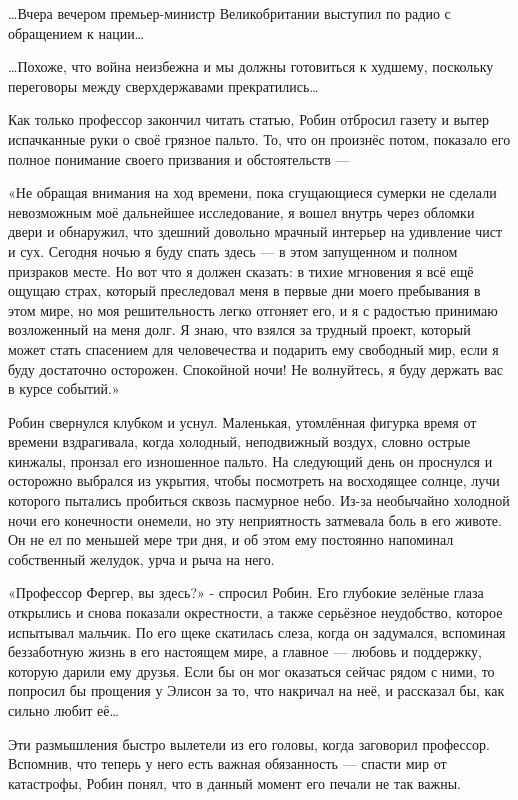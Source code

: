 \documentclass[a5paper, 9pt,
final, openany, twoside=true]{memoir}
\begin{document}
…Вчера вечером премьер-министр Великобритании выступил по радио с обращением к нации…\bigskip

…Похоже, что война неизбежна и мы должны готовиться к худшему, поскольку переговоры между сверхдержавами прекратились…\bigskip

Как только профессор закончил читать статью, Робин отбросил газету и вытер испачканные руки о своё грязное пальто. То, что он произнёс потом, показало его полное понимание своего призвания и обстоятельств —

«Не обращая внимания на ход времени, пока сгущающиеся сумерки не сделали невозможным моё дальнейшее исследование, я вошел внутрь через обломки двери и обнаружил, что здешний довольно мрачный интерьер на удивление чист и сух. Сегодня ночью я буду спать здесь — в этом запущенном и полном призраков месте. Но вот что я должен сказать: в тихие мгновения я всё ещё ощущаю страх, который преследовал меня в первые дни моего пребывания в этом мире, но моя решительность легко отгоняет его, и я с радостью принимаю возложенный на меня долг. Я знаю, что взялся за трудный проект, который может стать спасением для человечества и подарить ему свободный мир, если я буду достаточно осторожен. Спокойной ночи! Не волнуйтесь, я буду держать вас в курсе событий.»\bigskip

Робин свернулся клубком и уснул. Маленькая, утомлённая фигурка время от времени вздрагивала, когда холодный, неподвижный воздух, словно острые кинжалы, пронзал его изношенное пальто. На следующий день он проснулся и осторожно выбрался из укрытия, чтобы посмотреть на восходящее солнце, лучи которого пытались пробиться сквозь пасмурное небо. Из-за необычайно холодной ночи его конечности онемели, но эту неприятность затмевала боль в его животе. Он не ел по меньшей мере три дня, и об этом ему постоянно напоминал собственный желудок, урча и рыча на него.\bigskip

«Профессор Фергер, вы здесь?» - спросил Робин. Его глубокие зелёные глаза открылись и снова показали окрестности, а также серьёзное неудобство, которое испытывал мальчик. По его щеке скатилась слеза, когда он задумался, вспоминая беззаботную жизнь в его настоящем мире, а главное — любовь и поддержку, которую дарили ему друзья. Если бы он мог оказаться сейчас рядом с ними, то попросил бы прощения у Элисон за то, что накричал на неё, и рассказал бы, как сильно любит её…

Эти размышления быстро вылетели из его головы, когда заговорил профессор. Вспомнив, что теперь у него есть важная обязанность — спасти мир от катастрофы, Робин понял, что в данный момент его печали не так важны.
\end{document}
